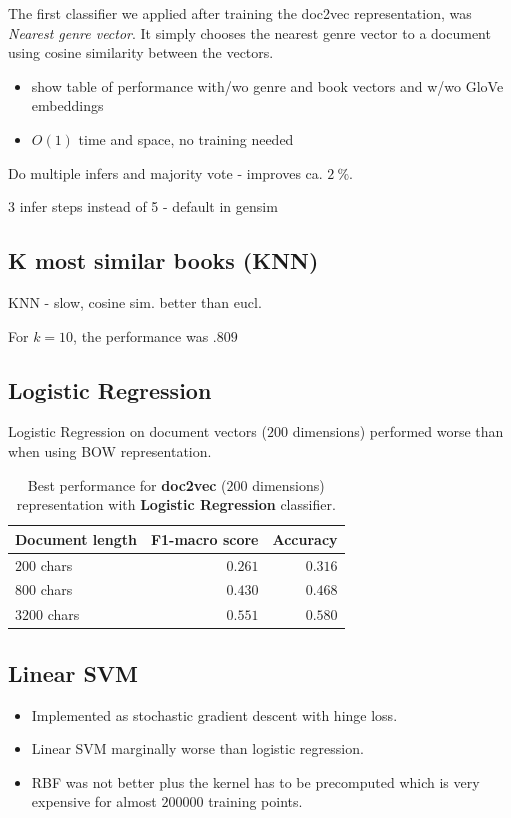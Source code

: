 The first classifier we applied after training the doc2vec representation, was \textit{Nearest genre vector}. It simply chooses the nearest genre vector to a document using cosine similarity between the vectors.

\begin{itemize}
	\item show table of performance with/wo genre and book vectors and w/wo GloVe embeddings
	\item $O(1)$ time and space, no training needed
\end{itemize}

Do multiple infers and majority vote - improves ca. $2\ \%$.

3 infer steps instead of 5 - default in gensim

\subsection{K most similar books (KNN)}

KNN - slow, cosine sim. better than eucl.

For $k = 10$, the performance was $.809$

\subsection{Logistic Regression}
Logistic Regression on document vectors ($200$ dimensions) performed worse than when using BOW representation.

\begin{table}[h]
	\centering
	\begin{tabular}{|l|r|r|}\hline
		Document length & F1-macro score & Accuracy \\
		\hline
		$200$ chars   &  $0.261$   & $0.316$   \\
		$800$ chars   &  $0.430$   & $0.468$   \\
		$3200$ chars  &  $0.551$   & $0.580$   \\
		\hline
	\end{tabular}
	\caption{Best performance for \textbf{doc2vec} ($200$ dimensions) representation with \textbf{Logistic Regression} classifier.}
	\label{tbl:doc2vec_logreg}
\end{table}

\subsection{Linear SVM}
\begin{itemize}
	\item Implemented as stochastic gradient descent with hinge loss.
	\item Linear SVM marginally worse than logistic regression.
	\item RBF was not better plus the kernel has to be precomputed which is very expensive for almost $200000$ training points.
\end{itemize}

